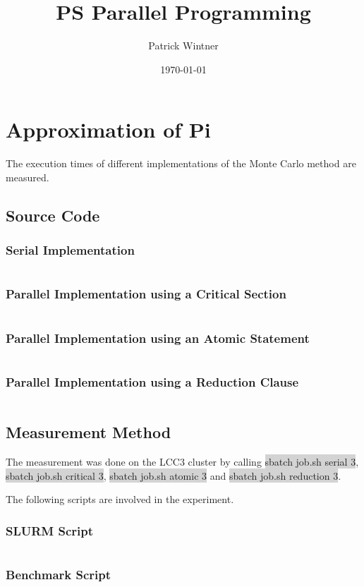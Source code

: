 \documentclass[parskip]{scrartcl}
\title{PS Parallel Programming}
\author{Patrick Wintner}
\date{\today}
\begin{document}
	\maketitle
	
	\section{Approximation of Pi}
	\label{ex1}
	The execution times of different implementations of the Monte Carlo method are measured.
	\subsection{Source Code}
	\subsubsection{Serial Implementation}
	\inputminted	[linenos]{c}{ex1/serial.c}
	\subsubsection{Parallel Implementation using a Critical Section}
	\inputminted	[linenos]{c}{ex1/critical.c}
	\subsubsection{Parallel Implementation using an Atomic Statement}
	\inputminted	[linenos]{c}{ex1/atomic.c}
	\subsubsection{Parallel Implementation using a Reduction Clause}
	\inputminted	[linenos]{c}{ex1/reduction.c}
	\subsection{Measurement Method}
	The measurement was done on the LCC3 cluster by calling \colorbox{lightgray}{sbatch job.sh serial 3}, \colorbox{lightgray}{sbatch job.sh critical 3}, \colorbox{lightgray}{sbatch job.sh atomic 3} and \colorbox{lightgray}{sbatch job.sh reduction 3}.
	
	The following scripts are involved in the experiment.
	\subsubsection{SLURM Script}
	\inputminted[linenos]{bash}{ex1/job.sh}
	\subsubsection{Benchmark Script}
	\inputminted[linenos]{bash}{ex1/benchmark.sh}
	
\end{document}
